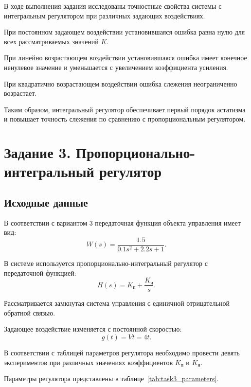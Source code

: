 \documentclass[12pt, a4paper]{article}
\begin{document}
В ходе выполнения задания исследованы
точностные свойства системы с интегральным
регулятором при различных задающих воздействиях.

При постоянном задающем воздействии
установившаяся ошибка равна нулю
для всех рассматриваемых значений $K$.

При линейно возрастающем воздействии
установившаяся ошибка имеет конечное
ненулевое значение и уменьшается
с увеличением коэффициента усиления.

При квадратично возрастающем воздействии
ошибка слежения неограниченно возрастает.

Таким образом, интегральный регулятор
обеспечивает первый порядок астатизма
и повышает точность слежения по сравнению
с пропорциональным регулятором.





\newpage
\section{Задание 3. Пропорционально-интегральный регулятор}

\subsection{Исходные данные}

В соответствии с вариантом 3 передаточная функция
объекта управления имеет вид:
\[
    W(s)=\frac{1.5}{0.1s^2+2.2s+1}.
\]

В системе используется пропорционально-интегральный
регулятор с передаточной функцией:
\begin{equation}
    \boxed{
    H(s)=K_{\text{п}}+\frac{K_{\text{и}}}{s}
    }.
\end{equation}

Рассматривается замкнутая система управления
с единичной отрицательной обратной связью.

Задающее воздействие изменяется
с постоянной скоростью:
\[
    g(t)=Vt=4t.
\]

В соответствии с таблицей параметров регулятора
необходимо провести девять экспериментов
при различных значениях коэффициентов
$K_{\text{п}}$ и $K_{\text{и}}$.

Параметры регулятора представлены
в таблице~\ref{tab:task3_parameters}.
\end{document}
